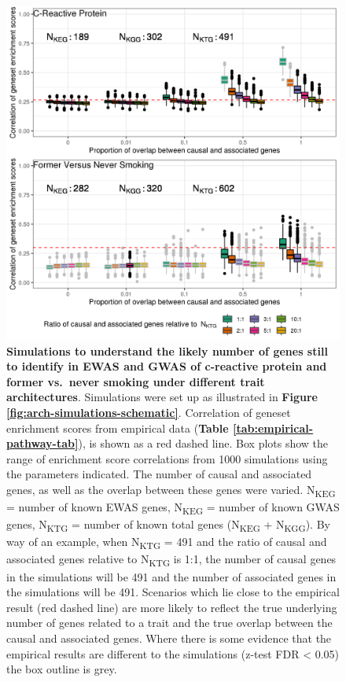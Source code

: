 \documentclass[11pt,twoside]{bristolthesis}
\begin{document}
\begin{figure}

{\centering \includegraphics[width=1\linewidth]{figure/06-ewas_gwas_comparison/architecture_sims_crp_fvns_only_correlation_of_pathway_enrichment_scores} 

}

\caption[Simulations to understand the likely number of genes still to identify in EWAS and GWAS of c-reactive protein and smoking (former vs.~never smokers) under different trait architectures]{\textbf{Simulations to understand the likely number of genes still to identify in EWAS and GWAS of c-reactive protein and former vs.~never smoking under different trait architectures}. Simulations were set up as illustrated in \textbf{Figure \ref{fig:arch-simulations-schematic}}. Correlation of geneset enrichment scores from empirical data (\textbf{Table \ref{tab:empirical-pathway-tab}}), is shown as a red dashed line. Box plots show the range of enrichment score correlations from 1000 simulations using the parameters indicated. The number of causal and associated genes, as well as the overlap between these genes were varied. N\textsubscript{KEG} = number of known EWAS genes, N\textsubscript{KEG} = number of known GWAS genes, N\textsubscript{KTG} = number of known total genes (N\textsubscript{KEG} + N\textsubscript{KGG}). By way of an example, when N\textsubscript{KTG} = 491 and the ratio of causal and associated genes relative to N\textsubscript{KTG} is 1:1, the number of causal genes in the simulations will be 491 and the number of associated genes in the simulations will be 491. Scenarios which lie close to the empirical result (red dashed line) are more likely to reflect the true underlying number of genes related to a trait and the true overlap between the causal and associated genes. Where there is some evidence that the empirical results are different to the simulations (z-test FDR \textless{} 0.05) the box outline is grey.}\label{fig:arch-simulations-crp-fvns}
\end{figure}
\end{document}
